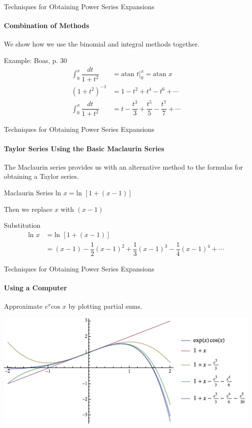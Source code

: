 \documentclass{beamer}
\begin{document}
\begin{frame}{Techniques for Obtaining Power Series Expansions}
   	\framesubtitle{Combination of Methods}
	We show how we use the binomial and integral methods together.
	\begin{exampleblock}{Example: Boas, p. 30}
	\begin{align*}
	\int_{0}^{x}\dfrac{dt}{1+t^{2}} &= \mbox{atan\ }t\Big|_{0}^{x} = \mbox{atan\ }x \\
	(1+t^{2})^{-1} &= 1 - t^{2}+ t^{4}- t^{6}+\cdots \\
	\int_{0}^{x}\dfrac{dt}{1+t^{2}} &= t - \dfrac{t^{3}}{3} + \dfrac{t^{5}}{5} - \dfrac{t^{7}}{7} +\cdots
	\end{align*}
	\end{exampleblock}
\end{frame}
  
\begin{frame}{Techniques for Obtaining Power Series Expansions}
    \framesubtitle{Taylor Series Using the Basic Maclaurin Series}
    The Maclaurin series provides us with an alternative method to the formulas for obtaining a Taylor series.
   \begin{exampleblock}{Maclaurin Series}
       	    $\mbox{ln\ } x = \mbox{ln\ }[1+(x-1)]$
   \end{exampleblock}
   Then we replace $x$ with $(x-1)$
   \begin{exampleblock}{Substitution}
   	\begin{align*}
   	    \mbox{ln\ } x&= \mbox{ln\ } [1+(x-1)] \\
	    &= (x-1)-\dfrac{1}{2}(x-1)^2+\dfrac{1}{3}(x-1)^3-\dfrac{1}{4}(x-1)^4+\cdots
	\end{align*}
   \end{exampleblock}
\end{frame}
  
\begin{frame}{Techniques for Obtaining Power Series Expansions}
    	\framesubtitle{Using a Computer}
	Approximate $e^{x}\mbox{cos\ }x$ by plotting partial sums.
	\begin{center}
		\includegraphics[width=.9\textwidth]{images/PowerSeriesPlot0.png}
	\end{center}
\end{frame}
  
\end{document}
